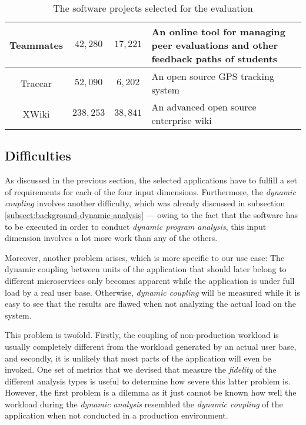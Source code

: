 \documentclass[12pt,a4paper]{report}
\begin{document}
\begin{table}[ht!]
\begin{tabularx}{\textwidth}{|c|c|c|X|}
Teammates           & $42,280$  & $17,221$  &
An online tool for managing peer evaluations and other feedback paths of students \\\hline

Traccar             & $52,090$  & $6,202$   &
An open source GPS tracking system \\\hline

XWiki               & $238,253$ & $38,841$  &
An advanced open source enterprise wiki \\\hline

\end{tabularx}
\caption{The software projects selected for the evaluation}
\label{table:evaluation-projects}
\end{table}


\subsection{Difficulties} \label{subsect:difficulties}

As discussed in the previous section, the selected applications have to fulfill
a set of requirements for each of the four input dimensions. Furthermore, the
\textit{dynamic coupling} involves another difficulty, which was already
discussed in subsection \ref{subsect:background-dynamic-analysis} --- owing to
the fact that the software has to be executed in order to conduct \textit{
dynamic program analysis}, this input dimension involves a lot more work than
any of the others.

Moreover, another problem arises, which is more specific to our use case: The
dynamic coupling between units of the application that should later belong to
different microservices only becomes apparent while the application is under
full load by a real user base. Otherwise, \textit{dynamic coupling} will be
measured while it is easy to see that the results are flawed when not analyzing
the actual load on the system.

This problem is twofold. Firstly, the coupling of non-production workload is
usually completely different from the workload generated by an actual user
base, and secondly, it is unlikely that most parts of the application will even
be invoked. One set of metrics that we devised that measure the \textit{
fidelity} of the different analysis types is useful to determine how severe
this latter problem is. However, the first problem is a dilemma as it just
cannot be known how well the workload during the \textit{dynamic analysis}
resembled the \textit{dynamic coupling} of the application when not conducted
in a production environment.
\end{document}
